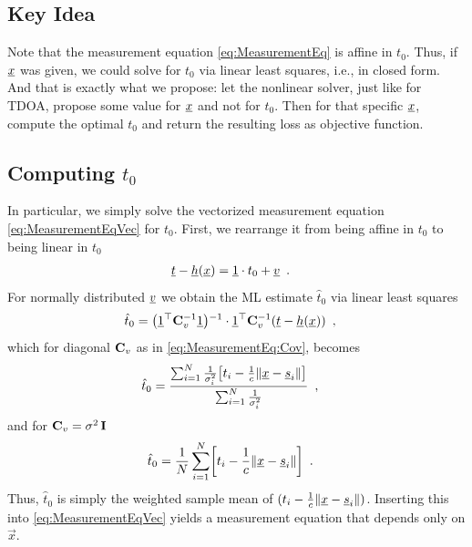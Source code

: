 \documentclass[conference]{IEEEtran}
\begin{document}
%
%
\subsection{Key Idea}
%
%
Note that the measurement equation \cref{eq:MeasurementEq} is affine in $t_0$. Thus, if ${\underline{x}}$ was given, we could solve for $t_0$ via linear least squares, i.e., in closed form. 
%
%
And that is exactly what we propose: let the nonlinear solver, just like for \ac{TDOA}, propose some value for ${\underline{x}}$ and not for $t_0$. Then for that specific ${\underline{x}}$, compute the optimal $t_0$ and return the resulting loss as objective function. 

%
%
\subsection{Computing \texorpdfstring{$t_0$}{t0}} 
In particular, we simply solve the vectorized measurement equation \cref{eq:MeasurementEqVec} for $t_0$. First, we rearrange it from being affine in $t_0$ to being linear in $t_0$
\begin{align}
    {\underline{t}} - \underline{h}({\underline{x}}) &= \underline{1} \cdot t_0  + {\underline{v}} \enspace. 
\end{align}
For normally distributed ${\underline{v}}$ we obtain the \ac{ML} estimate $\hat t_0$ via linear least squares
\begin{align}
    \hat t_0 &= \mathopen{}\left( \underline{1}^\top {\mathbf C}_v^{-1} \underline{1} \right)\mathclose{}^{-1} \cdot  \underline{1}^\top {\mathbf C}_v^{-1} \mathopen{}\left( {\underline{t}} - \underline{h}({\underline{x}}) \right)\mathclose{} \enspace, 
\end{align}
which for diagonal ${\mathbf C}_v$ as in \cref{eq:MeasurementEq:Cov}, becomes 
\begin{align}
    \hat t_0 &= \frac{\sum_{i=1}^N \frac{1}{\sigma_i^2} \mathopen{}\left[ t_i-\frac{1}{c}\mathopen{}\left\| {\underline{x}}-{\underline{s}}_i \right\|\mathclose{} \right]\mathclose{}}{\sum_{i=1}^N \frac{1}{\sigma_i^2}} \enspace, \label{eq:toa:t-LLS}
\end{align}
and for ${\mathbf C}_v= \sigma^2 \, {\mathbf I}$ 
\begin{align}
    \hat t_0 &= \frac{1}{N} \sum_{i=1}^N \mathopen{}\left[ t_i-\frac{1}{c}\mathopen{}\left\| {\underline{x}}-{\underline{s}}_i \right\|\mathclose{} \right]\mathclose{} \enspace. 
\end{align}
Thus, $\hat t_0$ is simply the weighted sample mean of $(t_i-\frac{1}{c}\mathopen{}\left\| {\underline{x}}-{\underline{s}}_i \right\|\mathclose{})$. 
Inserting this into \cref{eq:MeasurementEqVec} yields a measurement equation that depends only on $\vec x$. 


%
%
\end{document}
